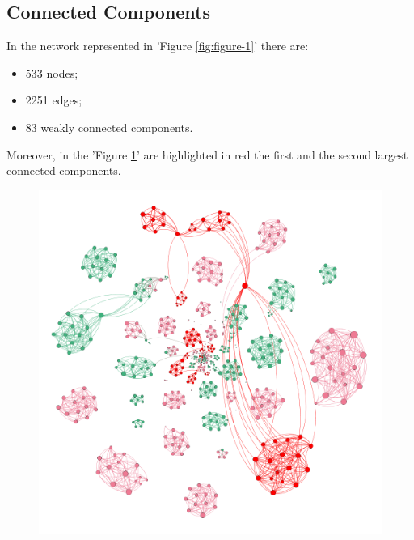 \documentclass{article}
\begin{document}
    \subsection{Connected Components}
        In the network represented in 'Figure \ref{fig:figure-1}' there are:
        \begin{itemize}
            \item 533 nodes;
            \item 2251 edges;
            \item 83 weakly connected components.
        \end{itemize}
        
        \noindent Moreover, in the 'Figure \ref{fig:figure-2.0}' are highlighted in red the first and the second largest connected components.
        \begin{figure}[H]
            \centering
            \includegraphics[width=1\textwidth]{2.0.png}
            \caption{}
            \label{fig:figure-2.0}
        \end{figure}
        
\end{document}
